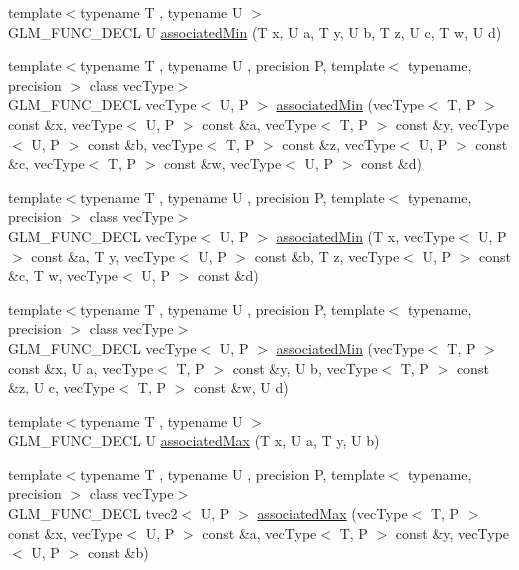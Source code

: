 \begin{DoxyCompactItemize}
\item 
{\footnotesize template$<$typename T , typename U $>$ }\\G\+L\+M\+\_\+\+F\+U\+N\+C\+\_\+\+D\+E\+C\+L U \hyperlink{group__gtx__associated__min__max_ga432224ebe2085eaa2b63a077ecbbbff6}{associated\+Min} (T x, U a, T y, U b, T z, U c, T w, U d)
\item 
{\footnotesize template$<$typename T , typename U , precision P, template$<$ typename, precision $>$ class vec\+Type$>$ }\\G\+L\+M\+\_\+\+F\+U\+N\+C\+\_\+\+D\+E\+C\+L vec\+Type$<$ U, P $>$ \hyperlink{group__gtx__associated__min__max_ga88e031f22b80215505928900d3dde549}{associated\+Min} (vec\+Type$<$ T, P $>$ const \&x, vec\+Type$<$ U, P $>$ const \&a, vec\+Type$<$ T, P $>$ const \&y, vec\+Type$<$ U, P $>$ const \&b, vec\+Type$<$ T, P $>$ const \&z, vec\+Type$<$ U, P $>$ const \&c, vec\+Type$<$ T, P $>$ const \&w, vec\+Type$<$ U, P $>$ const \&d)
\item 
{\footnotesize template$<$typename T , typename U , precision P, template$<$ typename, precision $>$ class vec\+Type$>$ }\\G\+L\+M\+\_\+\+F\+U\+N\+C\+\_\+\+D\+E\+C\+L vec\+Type$<$ U, P $>$ \hyperlink{group__gtx__associated__min__max_ga0f63b0dce5a5c3242cc6d9847e7d14f1}{associated\+Min} (T x, vec\+Type$<$ U, P $>$ const \&a, T y, vec\+Type$<$ U, P $>$ const \&b, T z, vec\+Type$<$ U, P $>$ const \&c, T w, vec\+Type$<$ U, P $>$ const \&d)
\item 
{\footnotesize template$<$typename T , typename U , precision P, template$<$ typename, precision $>$ class vec\+Type$>$ }\\G\+L\+M\+\_\+\+F\+U\+N\+C\+\_\+\+D\+E\+C\+L vec\+Type$<$ U, P $>$ \hyperlink{group__gtx__associated__min__max_ga00a949fd345f4b31b259f033d3ab4a1c}{associated\+Min} (vec\+Type$<$ T, P $>$ const \&x, U a, vec\+Type$<$ T, P $>$ const \&y, U b, vec\+Type$<$ T, P $>$ const \&z, U c, vec\+Type$<$ T, P $>$ const \&w, U d)
\item 
{\footnotesize template$<$typename T , typename U $>$ }\\G\+L\+M\+\_\+\+F\+U\+N\+C\+\_\+\+D\+E\+C\+L U \hyperlink{group__gtx__associated__min__max_ga7d9c8785230c8db60f72ec8975f1ba45}{associated\+Max} (T x, U a, T y, U b)
\item 
{\footnotesize template$<$typename T , typename U , precision P, template$<$ typename, precision $>$ class vec\+Type$>$ }\\G\+L\+M\+\_\+\+F\+U\+N\+C\+\_\+\+D\+E\+C\+L tvec2$<$ U, P $>$ \hyperlink{group__gtx__associated__min__max_ga10ba6001798f42a0f941f19ff30e066a}{associated\+Max} (vec\+Type$<$ T, P $>$ const \&x, vec\+Type$<$ U, P $>$ const \&a, vec\+Type$<$ T, P $>$ const \&y, vec\+Type$<$ U, P $>$ const \&b)

\end{DoxyCompactItemize}
